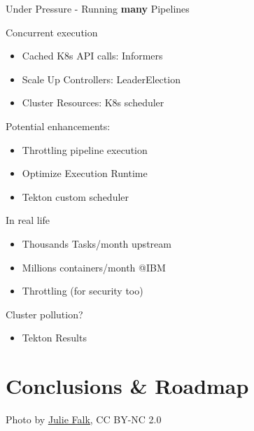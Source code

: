 \documentclass[aspectratio=169,11pt,hyperref={colorlinks=true}]{beamer}
\begin{document}
\begin{2columnsframe}%
  {%
    Under Pressure - Running \textbf{many} Pipelines%
  }%
  {%
  Concurrent execution
  \begin{itemize}
    \item Cached K8s API calls: Informers
    \item Scale Up Controllers: LeaderElection
    \item Cluster Resources: K8s scheduler
  \end{itemize}
  \vspace{0.17\textheight}
  Potential enhancements:
  \begin{itemize}
    \item Throttling pipeline execution
    \item Optimize Execution Runtime
    \item Tekton custom scheduler
  \end{itemize}
  }%
  {%
  In real life
  \begin{itemize}
    \item Thousands Tasks/month upstream
    \item Millions containers/month @IBM
    \item Throttling (for security too)
  \end{itemize}
  \vspace{0.17\textheight}
  Cluster pollution?
  \begin{itemize}
    \item Tekton Results
  \end{itemize}
  }
\end{2columnsframe}

\section[Roadmap]{Conclusions \& Roadmap}
\begin{sectionwithpich}{Photo by \href{https://www.flickr.com/photos/piper/}{\underline{Julie Falk}}, CC BY-NC 2.0}
\end{sectionwithpich}
\end{document}

